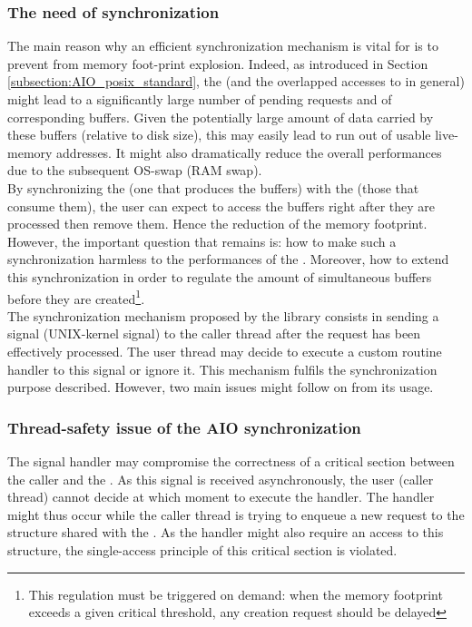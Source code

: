 		\subsubsection{The need of synchronization}
			The main reason why an efficient synchronization mechanism is vital for \notationaio\space is to prevent from memory foot-print explosion.   Indeed, as introduced in Section \ref{subsection:AIO_posix_standard}, the \notationaio\space (and the overlapped accesses to \notationIO\space in general) might lead to a significantly large number of pending requests and of corresponding buffers.   Given the potentially large amount of data carried by these buffers (relative to \notationIO\space disk size), this may easily lead to run out of usable live-memory addresses.   It might also dramatically reduce the overall performances due to the subsequent OS-swap (RAM swap).\\
			By synchronizing the \notationaioComputeThread\space (one that produces the buffers) with the \notationaioWriteThreads\space (those that consume them), the user can expect to access the buffers right after they are processed then remove them.   Hence the reduction of the memory footprint.   However, the important question that remains is: how to make such a synchronization harmless to the performances of the \notationaioComputeThread.   Moreover, how to extend this synchronization in order to regulate the amount of simultaneous buffers before they are created\footnote{This regulation must be triggered on demand: when the memory footprint exceeds a given critical threshold, any creation request should be delayed}.\\

			The synchronization mechanism proposed by the \notationaioShort\space library consists in sending a signal (UNIX-kernel signal) to the caller thread after the \notationIO\space request has been effectively processed.   The user thread may decide to execute a custom routine handler to this signal or ignore it.   This mechanism fulfils the synchronization purpose described.   However, two main issues might follow on from its usage.


		\subsubsection{Thread-safety issue of the AIO synchronization}
			The signal handler may compromise the correctness of a critical section between the caller and the \notationaioWriteThreads.   As this signal is received asynchronously, the user (caller thread) cannot decide at which moment to execute the handler.   The handler might thus occur while the caller thread is trying to enqueue a new request to the structure shared with the \notationaioWriteThreads.   As the handler might also require an access to this structure, the single-access principle of this critical section is violated.\\

